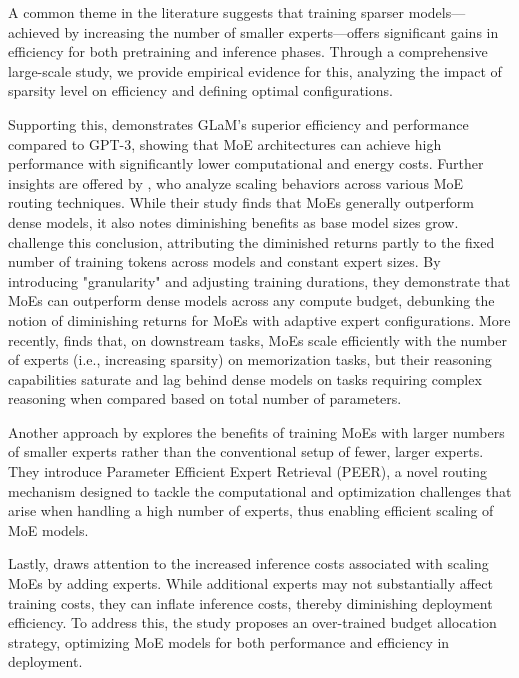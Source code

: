 A common theme in the literature suggests that training sparser models—achieved by increasing the number of smaller experts—offers significant gains in efficiency for both pretraining and inference phases. Through a comprehensive large-scale study, we provide empirical evidence for this, analyzing the impact of sparsity level on efficiency and defining optimal configurations.

Supporting this, \citet{Du2021GLaMES} demonstrates GLaM’s superior efficiency and performance compared to GPT-3, showing that MoE architectures can achieve high performance with significantly lower computational and energy costs. Further insights are offered by \citet{clark2022unified}, who analyze scaling behaviors across various MoE routing techniques. While their study finds that MoEs generally outperform dense models, it also notes diminishing benefits as base model sizes grow. \citet{ludziejewski2024scaling} challenge this conclusion, attributing the diminished returns partly to the fixed number of training tokens across models and constant expert sizes. By introducing "granularity" and adjusting training durations, they demonstrate that MoEs can outperform dense models across any compute budget, debunking the notion of diminishing returns for MoEs with adaptive expert configurations. More recently, \citet{jelassi2024mixture} finds that, on downstream tasks, MoEs scale efficiently with the number of experts (i.e., increasing sparsity) on memorization tasks, but their reasoning capabilities saturate and lag behind dense models on tasks requiring complex reasoning when compared based on total number of parameters.

Another approach by \citet{he2024mixture} explores the benefits of training MoEs with larger numbers of smaller experts rather than the conventional setup of fewer, larger experts. They introduce Parameter Efficient Expert Retrieval (PEER), a novel routing mechanism designed to tackle the computational and optimization challenges that arise when handling a high number of experts, thus enabling efficient scaling of MoE models.

Lastly, \citet{yun2024toward} draws attention to the increased inference costs associated with scaling MoEs by adding experts. While additional experts may not substantially affect training costs, they can inflate inference costs, thereby diminishing deployment efficiency. To address this, the study proposes an over-trained budget allocation strategy, optimizing MoE models for both performance and efficiency in deployment.